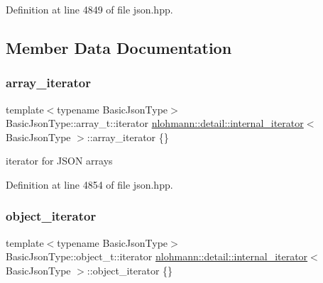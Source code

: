 Definition at line 4849 of file json.\+hpp.



\subsection{Member Data Documentation}
\mbox{\label{structnlohmann_1_1detail_1_1internal__iterator_a8294a6e6f01b58e1cce8fbae66a50b5d}} 
\subsubsection{\texorpdfstring{array\+\_\+iterator}{array\_iterator}}
{\footnotesize\ttfamily template$<$typename Basic\+Json\+Type$>$ \\
Basic\+Json\+Type\+::array\+\_\+t\+::iterator \hyperlink{structnlohmann_1_1detail_1_1internal__iterator}{nlohmann\+::detail\+::internal\+\_\+iterator}$<$ Basic\+Json\+Type $>$\+::array\+\_\+iterator \{\}}



iterator for J\+S\+ON arrays 



Definition at line 4854 of file json.\+hpp.

\mbox{\label{structnlohmann_1_1detail_1_1internal__iterator_a8cb0af3498061426c1d0a65ad6220408}} 
\subsubsection{\texorpdfstring{object\+\_\+iterator}{object\_iterator}}
{\footnotesize\ttfamily template$<$typename Basic\+Json\+Type$>$ \\
Basic\+Json\+Type\+::object\+\_\+t\+::iterator \hyperlink{structnlohmann_1_1detail_1_1internal__iterator}{nlohmann\+::detail\+::internal\+\_\+iterator}$<$ Basic\+Json\+Type $>$\+::object\+\_\+iterator \{\}}



